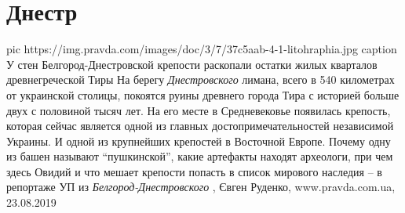  
 
 
 
 
\chapter{Днестр}

\ifcmt
  pic https://img.pravda.com/images/doc/3/7/37c5aab-4-1-litohraphia.jpg
	caption У стен Белгород-Днестровской крепости раскопали остатки жилых кварталов древнегреческой Тиры
\fi
На берегу \emph{Днестровского} лимана, всего в 540 километрах от украинской
столицы, покоятся руины древнего города Тира с историей больше двух с половиной
тысяч лет. На его месте в Средневековье появилась крепость, которая сейчас
является одной из главных достопримечательностей независимой Украины. И одной
из крупнейших крепостей в Восточной Европе. Почему одну из башен называют
\enquote{пушкинской}, какие артефакты находят археологи, при чем здесь Овидий и
что мешает крепости попасть в список мирового наследия – в репортаже УП из
\emph{Белгород-Днестровского}
, 
Євген Руденко, www.pravda.com.ua, 23.08.2019

